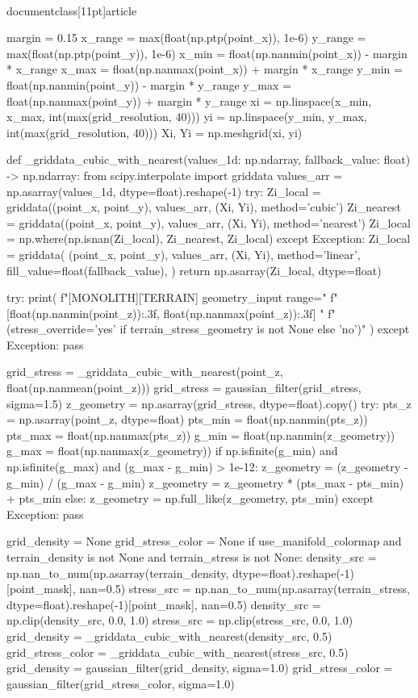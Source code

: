 \\documentclass[11pt]{article}
\begin{document}
\begin{CodeBlock}
    margin = 0.15
    x_range = max(float(np.ptp(point_x)), 1e-6)
    y_range = max(float(np.ptp(point_y)), 1e-6)
    x_min = float(np.nanmin(point_x)) - margin * x_range
    x_max = float(np.nanmax(point_x)) + margin * x_range
    y_min = float(np.nanmin(point_y)) - margin * y_range
    y_max = float(np.nanmax(point_y)) + margin * y_range
    xi = np.linspace(x_min, x_max, int(max(grid_resolution, 40)))
    yi = np.linspace(y_min, y_max, int(max(grid_resolution, 40)))
    Xi, Yi = np.meshgrid(xi, yi)

    def _griddata_cubic_with_nearest(values_1d: np.ndarray, fallback_value: float) -> np.ndarray:
        from scipy.interpolate import griddata
        values_arr = np.asarray(values_1d, dtype=float).reshape(-1)
        try:
            Zi_local = griddata((point_x, point_y), values_arr, (Xi, Yi), method='cubic')
            Zi_nearest = griddata((point_x, point_y), values_arr, (Xi, Yi), method='nearest')
            Zi_local = np.where(np.isnan(Zi_local), Zi_nearest, Zi_local)
        except Exception:
            Zi_local = griddata(
                (point_x, point_y),
                values_arr,
                (Xi, Yi),
                method='linear',
                fill_value=float(fallback_value),
            )
        return np.asarray(Zi_local, dtype=float)

    try:
        print(
            f"[MONOLITH][TERRAIN] geometry_input range="
            f"[{float(np.nanmin(point_z)):.3f}, {float(np.nanmax(point_z)):.3f}] "
            f"(stress_override={'yes' if terrain_stress_geometry is not None else 'no'})"
        )
    except Exception:
        pass

    grid_stress = _griddata_cubic_with_nearest(point_z, float(np.nanmean(point_z)))
    grid_stress = gaussian_filter(grid_stress, sigma=1.5)
    z_geometry = np.asarray(grid_stress, dtype=float).copy()
    try:
        pts_z = np.asarray(point_z, dtype=float)
        pts_min = float(np.nanmin(pts_z))
        pts_max = float(np.nanmax(pts_z))
        g_min = float(np.nanmin(z_geometry))
        g_max = float(np.nanmax(z_geometry))
        if np.isfinite(g_min) and np.isfinite(g_max) and (g_max - g_min) > 1e-12:
            z_geometry = (z_geometry - g_min) / (g_max - g_min)
            z_geometry = z_geometry * (pts_max - pts_min) + pts_min
        else:
            z_geometry = np.full_like(z_geometry, pts_min)
    except Exception:
        pass

    grid_density = None
    grid_stress_color = None
    if use_manifold_colormap and terrain_density is not None and terrain_stress is not None:
        density_src = np.nan_to_num(np.asarray(terrain_density, dtype=float).reshape(-1)[point_mask], nan=0.5)
        stress_src = np.nan_to_num(np.asarray(terrain_stress, dtype=float).reshape(-1)[point_mask], nan=0.5)
        density_src = np.clip(density_src, 0.0, 1.0)
        stress_src = np.clip(stress_src, 0.0, 1.0)
        grid_density = _griddata_cubic_with_nearest(density_src, 0.5)
        grid_stress_color = _griddata_cubic_with_nearest(stress_src, 0.5)
        grid_density = gaussian_filter(grid_density, sigma=1.0)
        grid_stress_color = gaussian_filter(grid_stress_color, sigma=1.0)


\end{CodeBlock}
\end{document}
